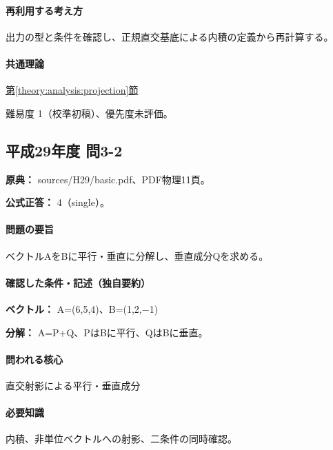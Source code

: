 \paragraph{再利用する考え方} 出力の型と条件を確認し、正規直交基底による内積の定義から再計算する。

\paragraph{共通理論} \hyperref[theory:analysis:projection]{第\ref*{theory:analysis:projection}節}

\par 難易度 1（校準初稿）、優先度未評価。

\subsection{平成29年度 問3-2}
\label{q:h29-reg-basic-3-2}

\noindent\textbf{原典：} sources/H29/basic.pdf、PDF物理11頁。

\textbf{公式正答：} 4（single）。

\paragraph{問題の要旨} ベクトルAをBに平行・垂直に分解し、垂直成分Qを求める。

\paragraph{確認した条件・記述（独自要約）}\mbox{}\par

\noindent\textbf{ベクトル：} A=\allowbreak{}(6,5,4)、B=\allowbreak{}(1,2,−1)\par

\noindent\textbf{分解：} A=\allowbreak{}P+Q、PはBに平行、QはBに垂直。\par

\paragraph{問われる核心} 直交射影による平行・垂直成分

\paragraph{必要知識} 内積、非単位ベクトルへの射影、二条件の同時確認。


